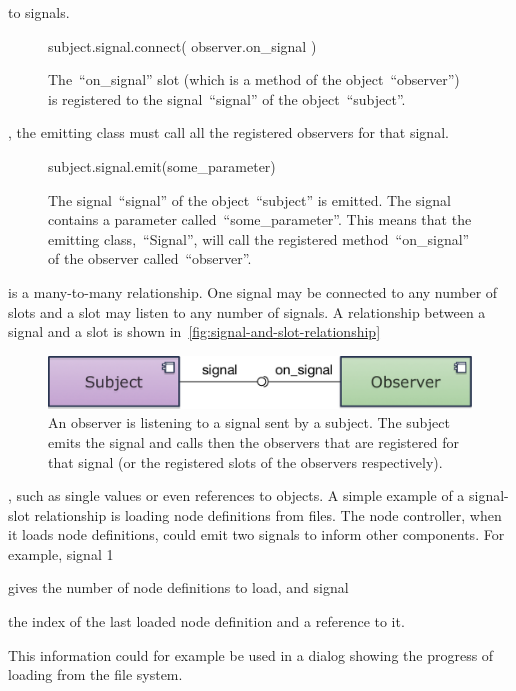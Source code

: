 \documentclass[%
    a4paper,    %
    justified,  %
    nobib,      %
    openany     %
]{tufte-book}
\makeatletter
\renewcommand{\label}[1]{\@tufte@label{##1}}%
\makeatother
\begin{document}
 to signals.

\begin{figure}
  \begin{pythoncode}
subject.signal.connect(
    observer.on_signal
)
  \end{pythoncode}
  \label{lst:signal-slot:connect}
  \caption{The~\enquote{on\_signal} slot (which is a method of the
    object~\enquote{observer}) is registered to the signal~\enquote{signal} of
    the object~\enquote{subject}.}
\end{figure}

, the emitting class must call all the
registered observers for that signal.

\begin{figure}
  \begin{pythoncode}
subject.signal.emit(some_parameter)
  \end{pythoncode}
  \label{lst:signal-slot:emit}
  \caption{The signal~\enquote{signal} of the object~\enquote{subject} is
    emitted. The signal contains a parameter called~\enquote{some\_parameter}.
    This means that the emitting class,~\enquote{Signal}, will call the
    registered method~\enquote{on\_signal} of the observer
    called~\enquote{observer}.}
\end{figure}

 is a many-to-many
relationship. One signal may be connected to any number of slots and a slot may
listen to any number of signals. A relationship between a signal and a slot is
shown in~\cref{fig:signal-and-slot-relationship}

\begin{figure}[ht]
  \includegraphics[width=0.8\linewidth]{images/signal-and-slot}
  \caption{An observer is listening to a signal sent by a subject. The subject
    emits the signal and calls then the observers that are registered for that
    signal (or the registered slots of the observers respectively).}
  \label{fig:signal-and-slot-relationship}
\end{figure}

, such as single values or
even references to objects. A simple example of a signal-slot relationship is
loading node definitions from files. The node controller, when it loads node
definitions, could emit two signals to inform other components. For example,
signal 1
\begin{enumerate*}
  \item gives the number of node definitions to load, and signal
  \item the index of the last loaded node definition and a reference to it.
\end{enumerate*}
This information could for example be used in a dialog showing the progress of
loading from the file system.
\end{document}
